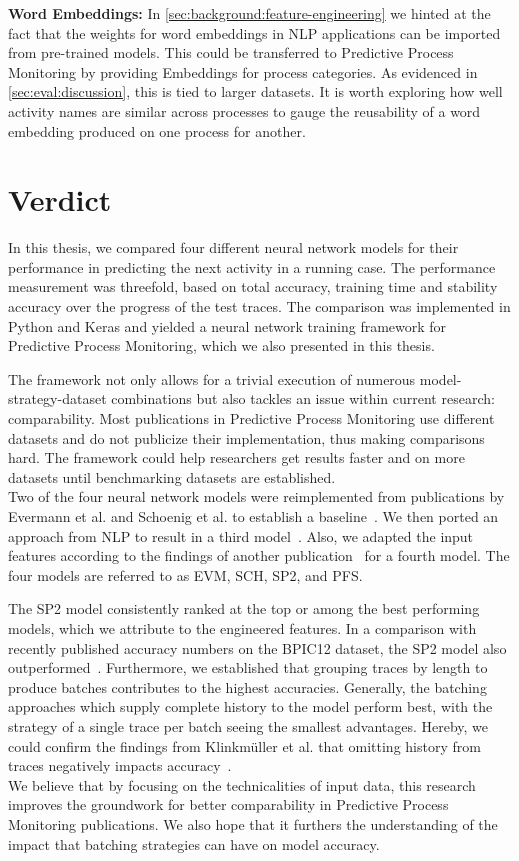 \noindent\textbf{Word Embeddings:} In \autoref{sec:background:feature-engineering} we hinted at the fact that the weights for word embeddings in NLP applications can be imported from pre-trained models. This could be transferred to Predictive Process Monitoring by providing Embeddings for process categories. As evidenced in \autoref{sec:eval:discussion}, this is tied to larger datasets. It is worth exploring how well activity names are similar across processes to gauge the reusability of a word embedding produced on one process for another.

\section{Verdict} \label{sec:conclusion:verdict}
In this thesis, we compared four different neural network models for their performance in predicting the next activity in a running case. The performance measurement was threefold, based on total accuracy, training time and stability accuracy over the progress of the test traces. The comparison was implemented in Python and Keras and yielded a neural network training framework for Predictive Process Monitoring, which we also presented in this thesis.

The framework not only allows for a trivial execution of numerous model-strategy-dataset combinations but also tackles an issue within current research: comparability. Most publications in Predictive Process Monitoring use different datasets and do not publicize their implementation, thus making comparisons hard. The framework could help researchers get results faster and on more datasets until benchmarking datasets are established.\\

Two of the four neural network models were reimplemented from publications by Evermann et al. and Schoenig et al. to establish a baseline~\cite{evermann2016, schoenig2018}. We then ported an approach from NLP to result in a third model~\cite{shibata2016bipartite}. Also, we adapted the input features according to the findings of another publication~\cite{klinkmuller2018reliablemonitoring} for a fourth model. The four models are referred to as EVM, SCH, SP2, and PFS.

The SP2 model consistently ranked at the top or among the best performing models, which we attribute to the engineered features. In a comparison with recently published accuracy numbers on the BPIC12 dataset, the SP2 model also outperformed~\cite{boehmer2018probability, evermann2016}. Furthermore, we established that grouping traces by length to produce batches contributes to the highest accuracies. Generally, the batching approaches which supply complete history to the model perform best, with the strategy of a single trace per batch seeing the smallest advantages. Hereby, we could confirm the findings from Klinkmüller et al. that omitting history from traces negatively impacts accuracy~\cite{klinkmuller2018reliablemonitoring}.\\

We believe that by focusing on the technicalities of input data, this research improves the groundwork for better comparability in Predictive Process Monitoring publications. We also hope that it furthers the understanding of the impact that batching strategies can have on model accuracy.
